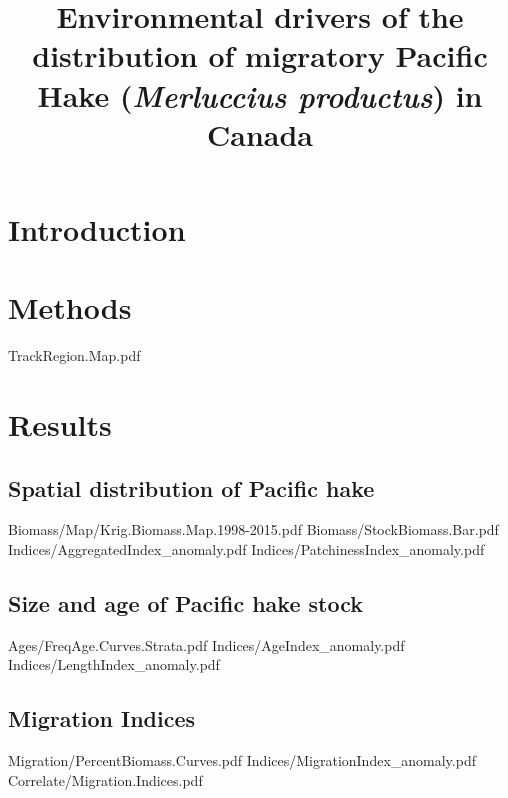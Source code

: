 \documentclass[12pt]{article}
\begin{document}
\title{Environmental drivers of the distribution of migratory Pacific Hake (\textit{Merluccius productus}) in Canada}
\maketitle
\small
\tableofcontents
\normalsize

\newpage
\section{Introduction}




\section{Methods}

TrackRegion.Map.pdf


\FloatBarrier
\section{Results}

\subsection{Spatial distribution of Pacific hake}

Biomass/Map/Krig.Biomass.Map.1998-2015.pdf
Biomass/StockBiomass.Bar.pdf
Indices/AggregatedIndex_anomaly.pdf
Indices/PatchinessIndex_anomaly.pdf

\subsection{Size and age of Pacific hake stock}

Ages/FreqAge.Curves.Strata.pdf
Indices/AgeIndex_anomaly.pdf
Indices/LengthIndex_anomaly.pdf

\subsection{Migration Indices}
Migration/PercentBiomass.Curves.pdf
Indices/MigrationIndex_anomaly.pdf
Correlate/Migration.Indices.pdf
\end{document}
